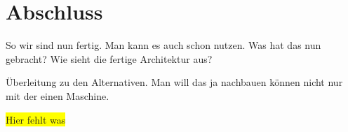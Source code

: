 \section{Abschluss}
So wir sind nun fertig. Man kann es auch schon nutzen. Was hat das nun gebracht? Wie sieht die fertige Architektur aus?

Überleitung zu den Alternativen. Man will das ja nachbauen können nicht nur mit der einen Maschine.

\colorbox{yellow}{Hier fehlt was}